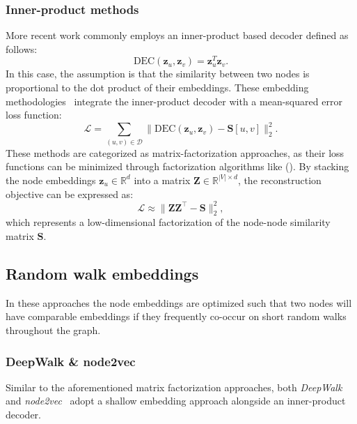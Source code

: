 \subsubsection{Inner-product methods}
More recent work commonly employs an inner-product based decoder defined as follows:
\begin{equation}\label{eq:innerProductDec}
    \text{DEC}(\mathbf{z}_u, \mathbf{z}_v) = \mathbf{z}_u^T\mathbf{z}_v.
\end{equation}
In this case, the assumption is that the similarity between two nodes is proportional to the dot product of their embeddings. These embedding methodologies~\cite{Ahmed2013distributedLargeScaleNaturalGraphFactorization}\cite{Cao2015grarep}\cite{Ou2016asymmetricTransitivityPreservingGraphEmbedding} integrate the inner-product decoder with a mean-squared error loss function:
\begin{equation*}
    \mathcal{L} = \sum_{(u,v)\in\mathcal{D}} \|\text{DEC}(\mathbf{z}_u, \mathbf{z}_v) - \textbf{S}[u,v]\|_2^2.
\end{equation*}
These methods are categorized as matrix-factorization approaches, as their loss functions can be minimized through factorization algorithms like  (). By stacking the node embeddings $ \mathbf{z}_u \in \mathbb{R}^d $ into a matrix $ \mathbf{Z} \in \mathbb{R}^{|V|\times d} $, the reconstruction objective can be expressed as:
\begin{equation*}
    \mathcal{L} \approx \|\mathbf{Z}\mathbf{Z}^\top - \textbf{S}\|_2^2,
\end{equation*}
which represents a low-dimensional factorization of the node-node similarity matrix $ \textbf{S} $. 

\subsection{Random walk embeddings}
In these approaches the node embeddings are optimized such that two nodes will have comparable embeddings if they frequently co-occur on short random walks throughout the graph.

\subsubsection{DeepWalk \& node2vec}
Similar to the aforementioned matrix factorization approaches, both \textit{DeepWalk}~\cite{Perozzi2014DeepWalk} and \textit{node2vec}~\cite{Grover2016node2vec} adopt a shallow embedding approach alongside an inner-product decoder.

